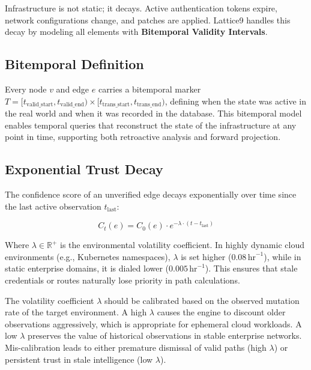 \documentclass[11pt,a4paper]{article}
\theoremstyle{definition}
\numberwithin{equation}{section}
\newcommand{\R}{\mathbb{R}}
\begin{document}
Infrastructure is not static; it decays. Active authentication tokens expire, network configurations change, and patches are applied. Lattice9 handles this decay by modeling all elements with \textbf{Bitemporal Validity Intervals}.

\subsection{Bitemporal Definition}\label{subsec:bitemporal}

Every node $v$ and edge $e$ carries a bitemporal marker $T = [t_{\text{valid\_start}}, t_{\text{valid\_end}}) \times [t_{\text{trans\_start}}, t_{\text{trans\_end}})$, defining when the state was active in the real world and when it was recorded in the database. This bitemporal model enables temporal queries that reconstruct the state of the infrastructure at any point in time, supporting both retroactive analysis and forward projection.

\subsection{Exponential Trust Decay}\label{subsec:trust-decay}

The confidence score of an unverified edge decays exponentially over time since the last active observation $t_{\text{last}}$:

\begin{equation}\label{eq:trust-decay}
C_t(e) = C_0(e) \cdot e^{-\lambda \cdot (t - t_{\text{last}})}
\end{equation}

Where $\lambda \in \R^+$ is the environmental volatility coefficient. In highly dynamic cloud environments (e.g., Kubernetes namespaces), $\lambda$ is set higher ($0.08\,\text{hr}^{-1}$), while in static enterprise domains, it is dialed lower ($0.005\,\text{hr}^{-1}$). This ensures that stale credentials or routes naturally lose priority in path calculations.

\begin{operationalnote}
The volatility coefficient $\lambda$ should be calibrated based on the observed mutation rate of the target environment. A high $\lambda$ causes the engine to discount older observations aggressively, which is appropriate for ephemeral cloud workloads. A low $\lambda$ preserves the value of historical observations in stable enterprise networks. Mis-calibration leads to either premature dismissal of valid paths (high $\lambda$) or persistent trust in stale intelligence (low $\lambda$).
\end{operationalnote}
\end{document}
